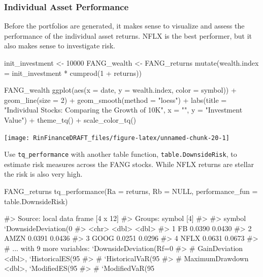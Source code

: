 \subsubsection{Individual Asset
Performance}\label{individual-asset-performance}

Before the portfolios are generated, it makes sense to visualize and
assess the performance of the individual asset returns. NFLX is the best
performer, but it also makes sense to investigate risk.

\begin{Schunk}
\begin{Sinput}
init_investment <- 10000
FANG_wealth <- FANG_returns %
    mutate(wealth.index = init_investment * cumprod(1 + returns))

FANG_wealth %
    ggplot(aes(x = date, y = wealth.index, color = symbol)) +
    geom_line(size = 2) +
    geom_smooth(method = "loess") +
    labs(title = "Individual Stocks: Comparing the Growth of 10K", x = "", y = "Investment Value") +
    theme_tq() +
    scale_color_tq()
\end{Sinput}


\begin{center}\texttt{[image: RinFinanceDRAFT\_files/figure-latex/unnamed-chunk-20-1]} \end{center}

\end{Schunk}

Use \texttt{tq\_performance} with another table function,
\texttt{table.DownsideRisk}, to estimate risk measures across the FANG
stocks. While NFLX returns are stellar the risk is also very high.

\begin{Schunk}
\begin{Sinput}
FANG_returns %
    tq_performance(Ra = returns, Rb = NULL, performance_fun = table.DownsideRisk)
\end{Sinput}
\begin{Soutput}
#> Source: local data frame [4 x 12]
#> Groups: symbol [4]
#> 
#>   symbol `DownsideDeviation(0%
#>    <chr>                   <dbl>                        <dbl>
#> 1     FB                  0.0390                       0.0430
#> 2   AMZN                  0.0391                       0.0436
#> 3   GOOG                  0.0251                       0.0296
#> 4   NFLX                  0.0631                       0.0673
#> # ... with 9 more variables: `DownsideDeviation(Rf=0%
#> #   GainDeviation <dbl>, `HistoricalES(95%
#> #   `HistoricalVaR(95%
#> #   MaximumDrawdown <dbl>, `ModifiedES(95%
#> #   `ModifiedVaR(95%
\end{Soutput}
\end{Schunk}

